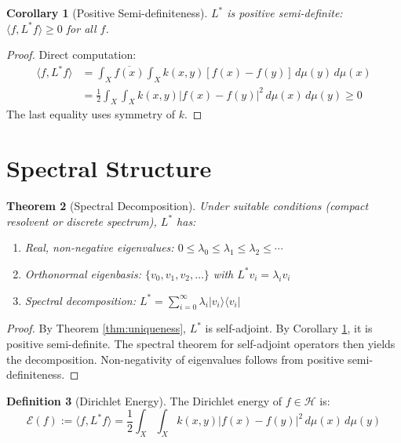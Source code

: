 \documentclass[11pt,a4paper]{article}
\theoremstyle{plain}
\newtheorem{theorem}{Theorem}[section]
\newtheorem{corollary}[theorem]{Corollary}
\theoremstyle{definition}
\newtheorem{definition}[theorem]{Definition}
\theoremstyle{remark}
\newcommand{\Hilbert}{\mathcal{H}}
\newcommand{\Laplacian}{L^*}
\newcommand{\ip}[2]{\langle #1, #2 \rangle}
\begin{document}
\begin{corollary}[Positive Semi-definiteness]\label{cor:positive}
$\Laplacian$ is positive semi-definite: $\ip{f}{\Laplacian f} \geq 0$ for all $f$.
\end{corollary}

\begin{proof}
Direct computation:
\begin{align*}
\ip{f}{\Laplacian f} &= \int_X \overline{f(x)} \int_X k(x,y)[f(x) - f(y)] \, d\mu(y) \, d\mu(x) \\
&= \frac{1}{2} \int_X \int_X k(x,y) |f(x) - f(y)|^2 \, d\mu(x) \, d\mu(y) \geq 0
\end{align*}
The last equality uses symmetry of $k$.
\end{proof}

\section{Spectral Structure}

\begin{theorem}[Spectral Decomposition]\label{thm:spectral}
Under suitable conditions (compact resolvent or discrete spectrum), $\Laplacian$ has:
\begin{enumerate}[label=(\roman*),noitemsep]
    \item Real, non-negative eigenvalues: $0 \leq \lambda_0 \leq \lambda_1 \leq \lambda_2 \leq \cdots$
    \item Orthonormal eigenbasis: $\{v_0, v_1, v_2, \ldots\}$ with $\Laplacian v_i = \lambda_i v_i$
    \item Spectral decomposition: $\Laplacian = \sum_{i=0}^{\infty} \lambda_i |v_i\rangle\langle v_i|$
\end{enumerate}
\end{theorem}

\begin{proof}
By Theorem \ref{thm:uniqueness}, $\Laplacian$ is self-adjoint. By Corollary \ref{cor:positive}, it is positive semi-definite. The spectral theorem for self-adjoint operators then yields the decomposition. Non-negativity of eigenvalues follows from positive semi-definiteness.
\end{proof}

\begin{definition}[Dirichlet Energy]\label{def:dirichlet}
The Dirichlet energy of $f \in \Hilbert$ is:
\begin{equation}
\mathcal{E}(f) := \ip{f}{\Laplacian f} = \frac{1}{2} \int_X \int_X k(x,y) |f(x) - f(y)|^2 \, d\mu(x) \, d\mu(y)
\end{equation}
\end{definition}
\end{document}

